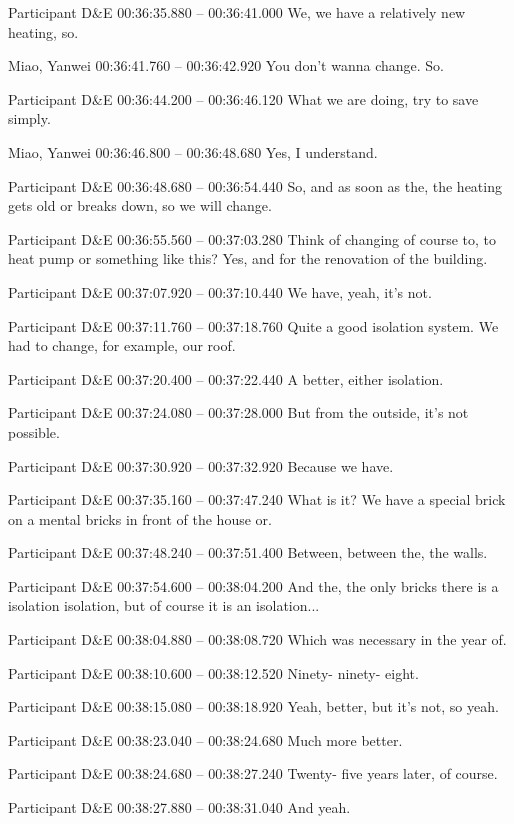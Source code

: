{Participant D\&E 00:36:35.880 -- 00:36:41.000
We, we have a relatively new heating, so.

Miao, Yanwei 00:36:41.760 -- 00:36:42.920
You don't wanna change. So.

Participant D\&E 00:36:44.200 -- 00:36:46.120
What we are doing, try to save simply.

Miao, Yanwei 00:36:46.800 -- 00:36:48.680
Yes, I understand.

Participant D\&E 00:36:48.680 -- 00:36:54.440
So, and as soon as the, the heating gets old or breaks down, so we will change.

Participant D\&E 00:36:55.560 -- 00:37:03.280
Think of changing of course to, to heat pump or something like this? Yes, and for the renovation of the building.

Participant D\&E 00:37:07.920 -- 00:37:10.440
We have, yeah, it's not.

Participant D\&E 00:37:11.760 -- 00:37:18.760
Quite a good isolation system. We had to change, for example, our roof.

Participant D\&E 00:37:20.400 -- 00:37:22.440
A better, either isolation.

Participant D\&E 00:37:24.080 -- 00:37:28.000
But from the outside, it's not possible.

Participant D\&E 00:37:30.920 -- 00:37:32.920
Because we have.

Participant D\&E 00:37:35.160 -- 00:37:47.240
What is it? We have a special brick on a mental bricks in front of the house or.

Participant D\&E 00:37:48.240 -- 00:37:51.400
Between, between the, the walls.

Participant D\&E 00:37:54.600 -- 00:38:04.200
And the, the only bricks there is a isolation isolation, but of course it is an isolation...

Participant D\&E 00:38:04.880 -- 00:38:08.720
Which was necessary in the year of.

Participant D\&E 00:38:10.600 -- 00:38:12.520
Ninety- ninety- eight.

Participant D\&E 00:38:15.080 -- 00:38:18.920
Yeah, better, but it's not, so yeah.

Participant D\&E 00:38:23.040 -- 00:38:24.680
Much more better.

Participant D\&E 00:38:24.680 -- 00:38:27.240
Twenty- five years later, of course.

Participant D\&E 00:38:27.880 -- 00:38:31.040
And yeah.

}
